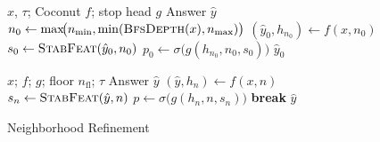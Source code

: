 \begin{figure}[H]
\centering
\begin{minipage}[t]{0.48\linewidth}
\begin{algorithm}[H]
\caption{Confidence Fallback}
\label{alg:conf-fallback}
\footnotesize
\begin{algorithmic}[1]
\Require $x$, $\tau$; Coconut $f$; stop head $g$
\Ensure Answer $\hat{y}$
\State $n_0 \gets \max\!\bigl(n_{\min}, \min(\mbox{\textsc{BfsDepth}}(x), n_{\max})\bigr)$
\State $(\hat{y}_0, h_{n_0}) \gets f(x, n_0)$
\State $s_0 \gets \mbox{\textsc{StabFeat}}(\hat{y}_0, n_0)$
\State $p_0 \gets \sigma\bigl(g(h_{n_0}, n_0, s_0)\bigr)$
    \State \Return $\hat{y}_0$
\Else
    \State \Return \mbox{}
\EndIf
\end{algorithmic}
\end{algorithm}
\end{minipage}\hfill
\begin{minipage}[t]{0.48\linewidth}
\begin{algorithm}[H]
\caption{Neighborhood Refinement}
\label{alg:refinement}
\footnotesize
\begin{algorithmic}[1]
\Require $x$; $f$; $g$; floor $n_{\mathrm{fl}}$; $\tau$
\Ensure Answer $\hat{y}$
    \State $(\hat{y}, h_n) \gets f(x, n)$
    \State $s_n \gets \mbox{\textsc{StabFeat}}(\hat{y}, n)$
    \State $p \gets \sigma\bigl(g(h_n, n, s_n)\bigr)$
        \State \textbf{break}
    \EndIf
\EndFor
\State \Return $\hat{y}$
\end{algorithmic}
\end{algorithm}
\end{minipage}
\end{figure}
\vspace{-2mm}
